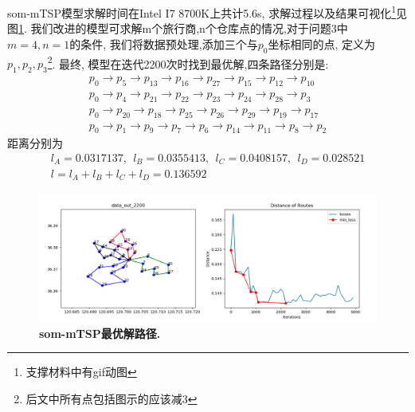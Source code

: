 som-mTSP模型求解时间在Intel I7 8700K上共计5.6s, 求解过程以及结果可视化\footnote{支撑材料中有gif动图}见图\ref{fig:mtsp-solution}. 我们改进的模型可求解m个旅行商,n个仓库点的情况,对于问题3中$m=4, n=1$的条件, 我们将数据预处理,添加三个与$p_0$坐标相同的点, 定义为$p_1,p_2,p_3$\footnote{后文中所有点包括图示的应该减3}.
最终, 模型在迭代2200次时找到最优解,四条路径分别是:
\begin{eqnarray}
    \nonumber
    p_0 \rightarrow p_5 \rightarrow p_{13} \rightarrow p_{16} \rightarrow p_{27} \rightarrow p_{15} \rightarrow p_{12} \rightarrow p_{10}\\
    \nonumber
    p_0 \rightarrow p_{4} \rightarrow p_{21} \rightarrow p_{22} \rightarrow p_{23} \rightarrow p_{24} \rightarrow p_{28} \rightarrow p_{3}\\
    \nonumber
    p_{0} \rightarrow p_{20} \rightarrow p_{18} \rightarrow p_{25} \rightarrow p_{26} \rightarrow p_{29} \rightarrow p_{19} \rightarrow p_{17}\\
    \nonumber
    p_{0}\rightarrow p_{1}\rightarrow p_{9}  \rightarrow p_{7} \rightarrow p_{6} \rightarrow p_{14} \rightarrow p_{11} \rightarrow p_{8} \rightarrow p_{2}
\end{eqnarray}
距离分别为
\begin{eqnarray}
    \nonumber
    &l_A=0.0317137,~~l_B=0.0355413,~~l_C=0.0408157,~~l_D=0.028521&\\
    &l = l_A+l_B+l_C+l_D = 0.136592&
\end{eqnarray}


\begin{figure}[h]
    \begin{center}
        \includegraphics[width=0.95\linewidth]{fig/solution2}
    \end{center}
    \caption{\textbf{som-mTSP最优解路径.} }
        \label{fig:mtsp-solution}
  \end{figure}


